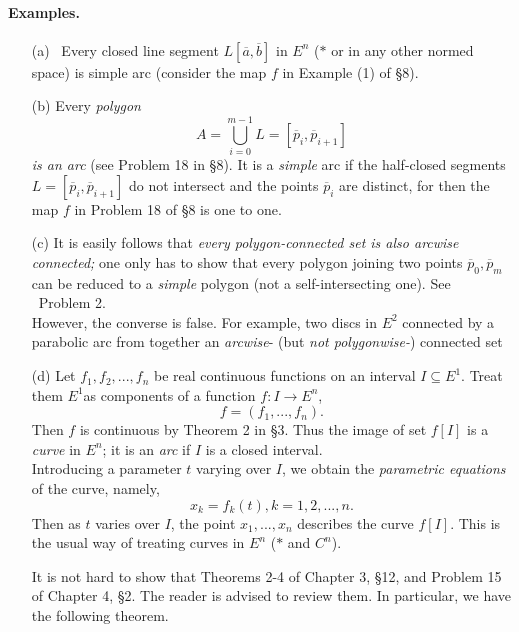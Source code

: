 \documentclass{article}
\begin{document}
\paragraph{Examples.}
\begin{enumerate}
    \item[(a)]\ Every closed line segment $L \left[\overline{a}, \overline{b}\right]$ in $E^n$ ($\ast$ or in any other normed space) is simple arc (consider the map $f$ in Example (1) of \S8).
    \item[(b)] Every \textit{polygon} 
    $$A = \bigcup_{i=0}^{m-1} L=\left[\overline{p}_{i}, \overline{p}_{i+1}\right] $$
    \textit{is an arc} (see Problem 18 in \S 8).  It is a \textit{simple} arc if the half-closed segments $L=\left[\overline{p}_{i}, \overline{p}_{i+1}\right]$ do not intersect and the points $\overline{p}_{i}$ are distinct, for then the map $f$ in Problem 18 of \S 8 is one to one.
    \item[(c)] It is easily follows that \textit{every polygon-connected set is also arcwise connected;} one only has to show that every polygon joining two points $\overline{p}_{0}, \overline{p}_{m}$ can be reduced to a \textit{simple} polygon (not a self-intersecting one). See \ Problem 2.\\
    However, the converse is false. For example, two discs in $E^2$ connected by a parabolic arc from together an \textit{arcwise}- (but \textit{not polygonwise-}) connected set
\end{enumerate}
\begin{enumerate}
    \item [(d)] Let $f_1, f_2,...,f_n$ be real continuous functions on an interval $I \subseteq E^1$. Treat them $E^1$as components of a function $f: I \to E^n$,  $$f = (f_1,...,f_n).$$
    Then $f$ is continuous by Theorem 2 in \S 3. Thus the image of set $f{[I]}$ is a \textit{curve} in $E^n$;  it is an \textit{arc} if $I$ is a closed interval.\\
    Introducing a parameter $t$ varying over $I$, we obtain the \textit{parametric equations} of the curve, namely, $$x_k = f_k(t),k=1,2,...,n.$$ 
    Then as $t$ varies over $I$, the point ${x_1,...,x_n}$ describes the curve $f{[I]}$. This is the usual way of treating curves in $E^n$ ($\ast$ and $C^n$).
\par
    It is not hard to show that Theorems 2-4 of Chapter 3, \S12, and Problem 15 of Chapter 4, \S2. The reader is advised to review them. In particular, we have the following theorem. 
\end{enumerate}
\end{document}
